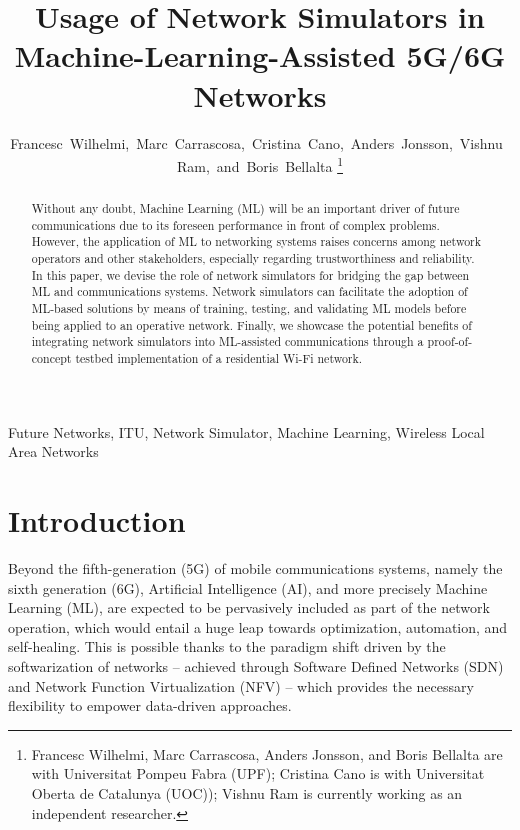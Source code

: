 \documentclass[journal]{IEEEtran}
\begin{document}
	\title{Usage of Network Simulators in \\Machine-Learning-Assisted 5G/6G Networks}
	
	\author{Francesc~Wilhelmi,~Marc~Carrascosa,~Cristina~Cano,~Anders~Jonsson,~Vishnu~Ram,~and~Boris~Bellalta%
		\thanks{Francesc Wilhelmi, Marc Carrascosa, Anders Jonsson, and Boris Bellalta are with Universitat Pompeu Fabra (UPF); Cristina Cano is with Universitat Oberta de Catalunya (UOC)); Vishnu Ram is currently working as an independent researcher.}%
	}
	
	\maketitle
	
	\begin{abstract}
		Without any doubt, Machine Learning (ML) will be an important driver of future communications due to its foreseen performance in front of complex problems. However, the application of ML to networking systems raises concerns among network operators and other stakeholders, especially regarding trustworthiness and reliability. In this paper, we devise the role of network simulators for bridging the gap between ML and communications systems. Network simulators can facilitate the adoption of ML-based solutions by means of training, testing, and validating ML models before being applied to an operative network. Finally, we showcase the potential benefits of integrating network simulators into ML-assisted communications through a proof-of-concept testbed implementation of a residential Wi-Fi network. 
	\end{abstract}
	
	\begin{IEEEkeywords}
		Future Networks, ITU, Network Simulator, Machine Learning, Wireless Local Area Networks
	\end{IEEEkeywords}
	
	\IEEEpeerreviewmaketitle
	
	\section{Introduction}
	Beyond the fifth-generation (5G) of mobile communications systems, namely the sixth generation (6G), Artificial Intelligence (AI), and more precisely Machine Learning (ML), are expected to be pervasively included as part of the network operation, which would entail a huge leap towards optimization, automation, and self-healing. This is possible thanks to the paradigm shift driven by the softwarization of networks -- achieved through Software Defined Networks (SDN) and Network Function Virtualization (NFV) -- which provides the necessary flexibility to empower data-driven approaches.
	
\end{document}
